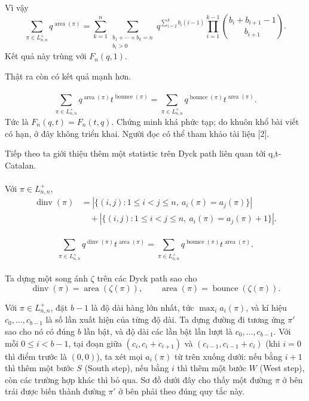 \documentclass[11pt]{article}
\begin{document}
Vì vậy
\[
  \sum_{\pi\in L^+_{n,n}}q^{\operatorname{area}(\pi)}
  =
  \sum_{k=1}^{n}
  \sum_{\substack{b_1+\cdots+b_k=n\\ b_i>0}}
  q^{\sum_{i=2}^{k}b_i(i-1)}
  \prod_{i=1}^{k-1}\binom{b_i+b_{i+1}-1}{b_{i+1}}.
\]
Kết quả này trùng với \(F_n(q,1)\).

Thật ra còn có kết quả mạnh hơn.

\paragraph{}
\[
  \sum_{\pi\in L^+_{n,n}}
  q^{\operatorname{area}(\pi)}t^{\operatorname{bounce}(\pi)}
  =
  \sum_{\pi\in L^+_{n,n}}
  q^{\operatorname{bounce}(\pi)}t^{\operatorname{area}(\pi)}.
\]
Tức là \(F_n(q,t)=F_n(t,q)\). Chứng minh khá phức tạp; do khuôn khổ bài viết
có hạn, ở đây không triển khai. Người đọc có thể tham khảo tài liệu [2].

Tiếp theo ta giới thiệu thêm một statistic trên Dyck path liên quan tới
q,t-Catalan.

\paragraph{}
Với \(\pi\in L^+_{n,n}\),
\[
\begin{aligned}
  \operatorname{dinv}(\pi)
  &=
  |\{(i,j):1\le i<j\le n,\ a_i(\pi)=a_j(\pi)\}| \\
  &\quad+
  |\{(i,j):1\le i<j\le n,\ a_i(\pi)=a_j(\pi)+1\}|.
\end{aligned}
\]

\paragraph{}
\[
  \sum_{\pi\in L^+_{n,n}}
  q^{\operatorname{dinv}(\pi)}t^{\operatorname{area}(\pi)}
  =
  \sum_{\pi\in L^+_{n,n}}
  q^{\operatorname{bounce}(\pi)}t^{\operatorname{area}(\pi)}.
\]

\paragraph{}
Ta dựng một song ánh \(\zeta\) trên các Dyck path sao cho
\[
  \operatorname{dinv}(\pi)=\operatorname{area}(\zeta(\pi)),
  \qquad
  \operatorname{area}(\pi)=\operatorname{bounce}(\zeta(\pi)).
\]

Với \(\pi\in L^+_{n,n}\), đặt \(b-1\) là độ dài hàng lớn nhất, tức
\(\max_i a_i(\pi)\), và kí hiệu \(c_0,\ldots,c_{b-1}\) là số lần xuất hiện của
từng độ dài. Ta dựng đường đi tương ứng \(\pi'\) sao cho nó có đúng \(b\) lần
bật, và độ dài các lần bật lần lượt là
\(c_0,\ldots,c_{b-1}\). Với mỗi \(0\le i<b-1\), tại đoạn giữa
\((c_i,c_i+c_{i+1})\) và \((c_{i-1},c_{i-1}+c_i)\) (khi \(i=0\) thì điểm trước
là \((0,0)\)), ta xét mọi \(a_i(\pi)\) từ trên xuống dưới: nếu bằng \(i+1\)
thì thêm một bước \(S\) (South step), nếu bằng \(i\) thì thêm một bước \(W\)
	(West step), còn các trường hợp khác thì bỏ qua. Sơ đồ dưới đây cho thấy một
đường \(\pi\) ở bên trái được biến thành đường \(\pi'\) ở bên phải theo đúng
quy tắc này.
\end{document}
